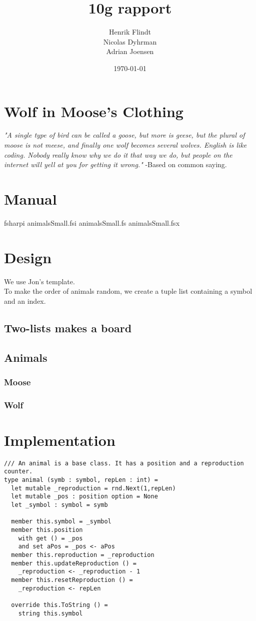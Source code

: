 \documentclass{article}
\title{10g rapport}
\author{Henrik Flindt\\Nicolas Dyhrman\\Adrian Joensen}
\date{\today}
\begin{document}
    \maketitle
    
    \section*{Wolf in Moose's Clothing}
    \textit{"A single type of bird can be called a goose, but more is geese, but the plural of moose is not meese, and finally one wolf becomes several wolves. English is like coding. Nobody really know why we do it that way we do, but people on the internet will yell at you for getting it wrong."} \newline -Based on common saying.
    \section{Manual}
   		fsharpi animalsSmall.fsi animalsSmall.fs animalsSmall.fsx
    
    \section{Design}
    	We use Jon's template.
    	\\
    	To make the order of animals random, we create a tuple list containing a symbol and an index.
    	\\
    \subsection{Two-lists makes a board}
    \subsection{Animals}
    \subsubsection{Moose}
    \subsubsection{Wolf}    

    \section{Implementation}
		\lstset{language=FSharp}

		\begin{lstlisting}
/// An animal is a base class. It has a position and a reproduction counter.
type animal (symb : symbol, repLen : int) =
  let mutable _reproduction = rnd.Next(1,repLen)
  let mutable _pos : position option = None
  let _symbol : symbol = symb

  member this.symbol = _symbol
  member this.position
    with get () = _pos
    and set aPos = _pos <- aPos
  member this.reproduction = _reproduction
  member this.updateReproduction () =
    _reproduction <- _reproduction - 1
  member this.resetReproduction () =
    _reproduction <- repLen

  override this.ToString () =
    string this.symbol
		\end{lstlisting}
		
\end{document}

